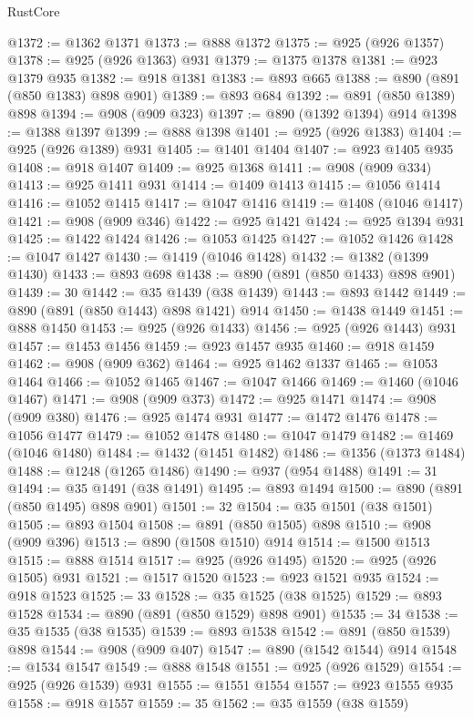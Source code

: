 \begin{lexlean}{RustCore}
\begin{coremodule}
@1372 := @1362 @1371
@1373 := @888 @1372
@1375 := @925 (@926 @1357)
@1378 := @925 (@926 @1363) @931
@1379 := @1375 @1378
@1381 := @923 @1379 @935
@1382 := @918 @1381
@1383 := @893 @665
@1388 := @890 (@891 (@850 @1383) @898 @901)
@1389 := @893 @684
@1392 := @891 (@850 @1389) @898
@1394 := @908 (@909 @323)
@1397 := @890 (@1392 @1394) @914
@1398 := @1388 @1397
@1399 := @888 @1398
@1401 := @925 (@926 @1383)
@1404 := @925 (@926 @1389) @931
@1405 := @1401 @1404
@1407 := @923 @1405 @935
@1408 := @918 @1407
@1409 := @925 @1368
@1411 := @908 (@909 @334)
@1413 := @925 @1411 @931
@1414 := @1409 @1413
@1415 := @1056 @1414
@1416 := @1052 @1415
@1417 := @1047 @1416
@1419 := @1408 (@1046 @1417)
@1421 := @908 (@909 @346)
@1422 := @925 @1421
@1424 := @925 @1394 @931
@1425 := @1422 @1424
@1426 := @1053 @1425
@1427 := @1052 @1426
@1428 := @1047 @1427
@1430 := @1419 (@1046 @1428)
@1432 := @1382 (@1399 @1430)
@1433 := @893 @698
@1438 := @890 (@891 (@850 @1433) @898 @901)
@1439 := 30
@1442 := @35 @1439 (@38 @1439)
@1443 := @893 @1442
@1449 := @890 (@891 (@850 @1443) @898 @1421) @914
@1450 := @1438 @1449
@1451 := @888 @1450
@1453 := @925 (@926 @1433)
@1456 := @925 (@926 @1443) @931
@1457 := @1453 @1456
@1459 := @923 @1457 @935
@1460 := @918 @1459
@1462 := @908 (@909 @362)
@1464 := @925 @1462 @1337
@1465 := @1053 @1464
@1466 := @1052 @1465
@1467 := @1047 @1466
@1469 := @1460 (@1046 @1467)
@1471 := @908 (@909 @373)
@1472 := @925 @1471
@1474 := @908 (@909 @380)
@1476 := @925 @1474 @931
@1477 := @1472 @1476
@1478 := @1056 @1477
@1479 := @1052 @1478
@1480 := @1047 @1479
@1482 := @1469 (@1046 @1480)
@1484 := @1432 (@1451 @1482)
@1486 := @1356 (@1373 @1484)
@1488 := @1248 (@1265 @1486)
@1490 := @937 (@954 @1488)
@1491 := 31
@1494 := @35 @1491 (@38 @1491)
@1495 := @893 @1494
@1500 := @890 (@891 (@850 @1495) @898 @901)
@1501 := 32
@1504 := @35 @1501 (@38 @1501)
@1505 := @893 @1504
@1508 := @891 (@850 @1505) @898
@1510 := @908 (@909 @396)
@1513 := @890 (@1508 @1510) @914
@1514 := @1500 @1513
@1515 := @888 @1514
@1517 := @925 (@926 @1495)
@1520 := @925 (@926 @1505) @931
@1521 := @1517 @1520
@1523 := @923 @1521 @935
@1524 := @918 @1523
@1525 := 33
@1528 := @35 @1525 (@38 @1525)
@1529 := @893 @1528
@1534 := @890 (@891 (@850 @1529) @898 @901)
@1535 := 34
@1538 := @35 @1535 (@38 @1535)
@1539 := @893 @1538
@1542 := @891 (@850 @1539) @898
@1544 := @908 (@909 @407)
@1547 := @890 (@1542 @1544) @914
@1548 := @1534 @1547
@1549 := @888 @1548
@1551 := @925 (@926 @1529)
@1554 := @925 (@926 @1539) @931
@1555 := @1551 @1554
@1557 := @923 @1555 @935
@1558 := @918 @1557
@1559 := 35
@1562 := @35 @1559 (@38 @1559)

\end{coremodule}
\end{lexlean}
